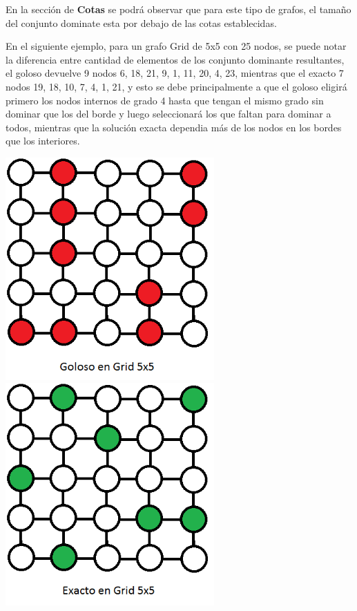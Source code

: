 En la sección de \textbf{Cotas} se podrá observar que para este tipo de grafos, el tamaño del conjunto dominate esta por debajo de las cotas establecidas.

En el siguiente ejemplo, para un grafo Grid de 5x5 con 25 nodos, se puede notar la diferencia entre cantidad de elementos de los conjunto dominante resultantes, el goloso devuelve 9 nodos {6, 18, 21, 9, 1, 11, 20, 4, 23}, mientras que el exacto 7 nodos {19, 18, 10, 7, 4, 1, 21}, y esto se debe principalmente a que el goloso eligirá primero los nodos internos de grado 4 hasta que tengan el mismo grado sin dominar que los del borde y luego seleccionará los que faltan para dominar a todos, mientras que la solución exacta dependia más de los nodos en los bordes que los interiores.
 
\includegraphics[width=8cm]{./graficos/grid_5x5_goloso.png}
\includegraphics[width=8cm]{./graficos/grid_5x5_exacto.png}

